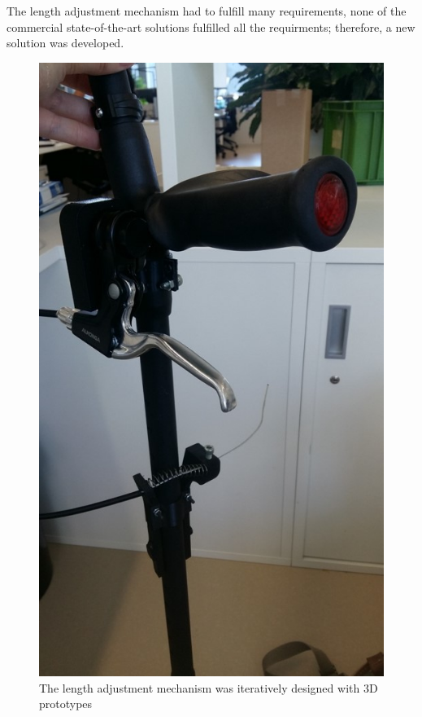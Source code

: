 The length adjustment mechanism had to fulfill many requirements, none of the commercial state-of-the-art solutions fulfilled all the requirments; therefore, a new solution was developed.\\
\begin{figure}
    \centering
    \includegraphics[width=0.8\columnwidth]{Appendix/LAM/3D_prototype_LAM.jpg}
    \caption{The length adjustment mechanism was iteratively designed with 3D prototypes}
    \label{fig:3D_LAM}
\end{figure}
